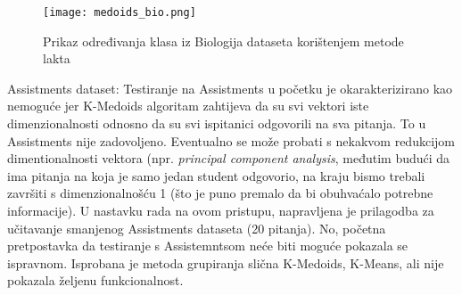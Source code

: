 \begin{figure}[!htb]
\centering
\texttt{[image: medoids\_bio.png]}
\caption{Prikaz određivanja klasa iz Biologija dataseta korištenjem metode lakta}
\label{fig:medoids_bio}
\end{figure}

Assistments dataset:\newline
Testiranje na Assistments u početku je okarakterizirano kao nemoguće jer K-Medoids algoritam zahtijeva da su svi vektori iste dimenzionalnosti odnosno da su svi ispitanici odgovorili na sva pitanja. To u Assistments nije zadovoljeno. Eventualno se može probati s nekakvom redukcijom dimentionalnosti vektora (npr. \textit{principal component analysis}, međutim budući da ima pitanja na koja je samo jedan student odgovorio, na kraju bismo trebali završiti s dimenzionalnošću 1 (što je puno premalo da bi obuhvaćalo potrebne informacije).\newline
U nastavku rada na ovom pristupu, napravljena je prilagodba za učitavanje smanjenog Assistments dataseta (20 pitanja). No, početna pretpostavka da testiranje s Assistemntsom neće biti moguće pokazala se ispravnom. Isprobana je metoda grupiranja slična K-Medoids, K-Means, ali nije pokazala željenu funkcionalnost.

